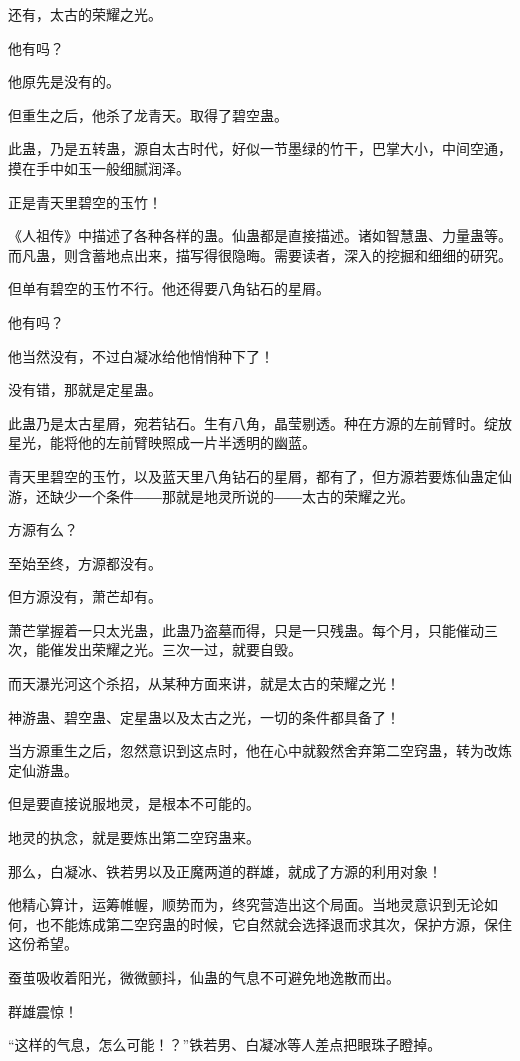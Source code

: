 \begin{this_body}
还有，太古的荣耀之光。

他有吗？

他原先是没有的。

但重生之后，他杀了龙青天。取得了碧空蛊。

此蛊，乃是五转蛊，源自太古时代，好似一节墨绿的竹干，巴掌大小，中间空通，摸在手中如玉一般细腻润泽。

正是青天里碧空的玉竹！

《人祖传》中描述了各种各样的蛊。仙蛊都是直接描述。诸如智慧蛊、力量蛊等。而凡蛊，则含蓄地点出来，描写得很隐晦。需要读者，深入的挖掘和细细的研究。

但单有碧空的玉竹不行。他还得要八角钻石的星屑。

他有吗？

他当然没有，不过白凝冰给他悄悄种下了！

没有错，那就是定星蛊。

此蛊乃是太古星屑，宛若钻石。生有八角，晶莹剔透。种在方源的左前臂时。绽放星光，能将他的左前臂映照成一片半透明的幽蓝。

青天里碧空的玉竹，以及蓝天里八角钻石的星屑，都有了，但方源若要炼仙蛊定仙游，还缺少一个条件――那就是地灵所说的――太古的荣耀之光。

方源有么？

至始至终，方源都没有。

但方源没有，萧芒却有。

萧芒掌握着一只太光蛊，此蛊乃盗墓而得，只是一只残蛊。每个月，只能催动三次，能催发出荣耀之光。三次一过，就要自毁。

而天瀑光河这个杀招，从某种方面来讲，就是太古的荣耀之光！

神游蛊、碧空蛊、定星蛊以及太古之光，一切的条件都具备了！

当方源重生之后，忽然意识到这点时，他在心中就毅然舍弃第二空窍蛊，转为改炼定仙游蛊。

但是要直接说服地灵，是根本不可能的。

地灵的执念，就是要炼出第二空窍蛊来。

那么，白凝冰、铁若男以及正魔两道的群雄，就成了方源的利用对象！

他精心算计，运筹帷幄，顺势而为，终究营造出这个局面。当地灵意识到无论如何，也不能炼成第二空窍蛊的时候，它自然就会选择退而求其次，保护方源，保住这份希望。

蚕茧吸收着阳光，微微颤抖，仙蛊的气息不可避免地逸散而出。

群雄震惊！

“这样的气息，怎么可能！？”铁若男、白凝冰等人差点把眼珠子瞪掉。


\end{this_body}
